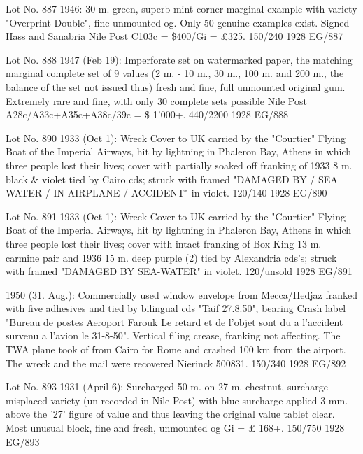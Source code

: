 \documentclass[justified]{tufte-book}
\begin{document}
%
{Lot No. 887
1946: 30 m. green, superb mint corner marginal example with variety "Overprint Double", fine unmounted og. Only 50 genuine examples exist. Signed Hass and Sanabria Nile Post C103c = \$400/Gi = \pounds{325}.  150/240}%
{1928}%
{EG/887}%
{}%
{}
{}%
{}

%
{Lot No. 888
1947 (Feb 19): Imperforate set on watermarked paper, the matching marginal complete set of 9 values (2 m. - 10 m., 30 m., 100 m. and 200 m., the balance of the set not issued thus) fresh and fine, full unmounted original gum. Extremely rare and fine, with only 30 complete sets possible Nile Post A28c/A33c+A35c+A38c/39c = \$ 1'000+.  440/2200}%
{1928}%
{EG/888}%
{}%
{}
{}%
{}


%
{Lot No. 890
1933 (Oct 1): Wreck Cover to UK carried by the "Courtier" Flying Boat of the Imperial Airways, hit by lightning in Phaleron Bay, Athens in which three people lost their lives; cover with partially soaked off franking of 1933 8 m. black \& violet tied by Cairo cds; struck with framed "DAMAGED BY / SEA WATER / IN AIRPLANE / ACCIDENT" in violet.  120/140}%
{1928}%
{EG/890}%
{}%
{}
{}%
{}

%
{Lot No. 891
1933 (Oct 1): Wreck Cover to UK carried by the "Courtier" Flying Boat of the Imperial Airways, hit by lightning in Phaleron Bay, Athens in which three people lost their lives; cover with intact franking of Box King 13 m. carmine pair and 1936 15 m. deep purple (2) tied by Alexandria cds's; struck with framed "DAMAGED BY SEA-WATER" in violet.  120/unsold}%
{1928}%
{EG/891}%
{}%
{}
{}%
{}

%
{1950 (31. Aug.): Commercially used window envelope from Mecca/Hedjaz franked with five adhesives and tied by bilingual cds "Taif 27.8.50", bearing Crash label "Bureau de postes Aeroport Farouk Le retard et de l'objet sont du a l'accident survenu a l'avion le 31-8-50". Vertical filing crease, franking not affecting. The TWA plane took of from Cairo for Rome and crashed 100 km from the airport. The wreck and the mail were recovered Nierinck 500831.
  150/340}%
{1928}%
{EG/892}%
{}%
{}
{}%
{}


%
{Lot No. 893
1931 (April 6): Surcharged 50 m. on 27 m. chestnut, surcharge misplaced variety (un-recorded in Nile Post) with blue surcharge applied 3 mm. above the '27' figure of value and thus leaving the original value tablet clear. Most unusual block, fine and fresh, unmounted og Gi = £ 168+. 150/750}%
{1928}%
{EG/893}%
{}%
{}
{}%
{}
\end{document}
